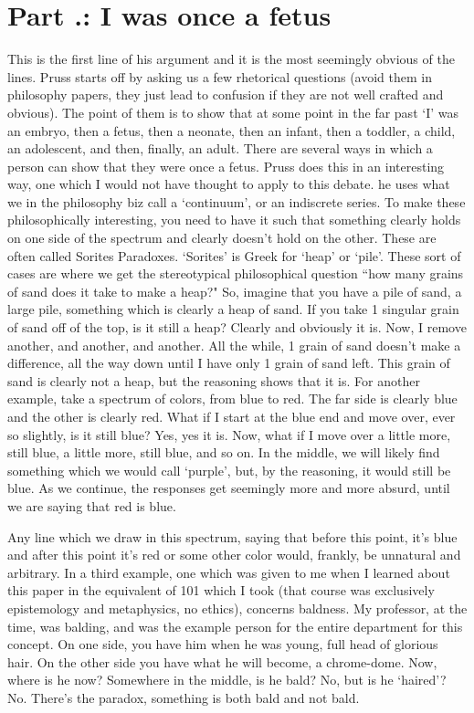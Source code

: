 \section{Part \thechapcount.\theseccount: I was once a fetus}
This is the first line of his argument and it is the most seemingly obvious of the lines. Pruss starts off by asking us a few rhetorical questions (avoid them in philosophy papers, they just lead to confusion if they are not well crafted and obvious). The point of them is to show that at some point in the far past `I' was an embryo, then a fetus, then a neonate, then an infant, then a toddler, a child, an adolescent, and then, finally, an adult. There are several ways in which a person can show that they were once a fetus. Pruss does this in an interesting way, one which I would not have thought to apply to this debate. he uses what we in the philosophy biz call a `continuum', or an indiscrete series. To make these philosophically interesting, you need to have it such that something clearly holds on one side of the spectrum and clearly doesn't hold on the other. These are often called Sorites Paradoxes. `Sorites' is Greek for `heap' or `pile'. These sort of cases are where we get the stereotypical philosophical question ``how many grains of sand does it take to make a heap?" So, imagine that you have a pile of sand, a large pile, something which is clearly a heap of sand. If you take 1 singular grain of sand off of the top, is it still a heap? Clearly and obviously it is. Now, I remove another, and another, and another. All the while, 1 grain of sand doesn't make a difference, all the way down until I have only 1 grain of sand left. This grain of sand is clearly not a heap, but the reasoning shows that it is. For another example, take a spectrum of colors, from blue to red. The far side is clearly blue and the other is clearly red. What if I start at the blue  end and move over, ever so slightly, is it still blue? Yes, yes it is. Now, what if I move over a little more, still blue, a little more, still blue, and so on. In the middle, we will likely find something which we would call `purple', but, by the reasoning, it would still be blue. As we continue, the responses get seemingly more and more absurd, until we are saying that red is blue.   

Any line which we draw in this spectrum, saying that before this point, it's blue and after this point it's red or some other color would, frankly, be unnatural and arbitrary. In a third example, one which was given to me when I learned about this paper in the equivalent of 101 which I took (that course was exclusively epistemology and metaphysics, no ethics), concerns baldness. My professor, at the time, was balding, and was the example person for the entire department for this concept. On one side, you have him when he was young, full head of glorious hair. On the other side you have what he will become, a chrome-dome. Now, where is he now? Somewhere in the middle, is he bald? No, but is he `haired'? No. There's the paradox, something is both bald and not bald. 

